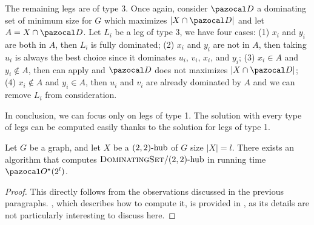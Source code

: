 \medskip

The remaining legs are of type 3. Once again, consider $\D$ a dominating set of minimum size for $G$ which maximizes $|X \cap \D|$ and let $A = X \cap \D$. Let $L_i$ be a leg of type 3, we have four cases: (1) $x_i$ and $y_i$ are both in $A$, then $L_i$ is fully dominated; (2) $x_i$ and $y_i$ are not in $A$, then taking $u_i$ is always the best choice since it dominates $u_i$, $v_i$, $x_i$, and $y_i$; (3) $x_i \in A$ and $y_i \notin A$, then  can apply and $\D$ does not maximizes $|X \cap \D|$; (4) $x_i \notin A$ and $y_i \in A$, then $u_i$ and $v_i$ are already dominated by $A$ and we can remove $L_i$ from consideration.

\medskip

In conclusion, we can focus only on legs of type 1. The solution with every type of legs can be computed easily thanks to the solution for legs of type 1.

\begin{theorem}
    \label{theorem:domset-22-alltypes}
    Let $G$ be a graph, and let $X$ be a $\sdhub[2,2]$ of $G$ size $|X| = l$. There exists an algorithm that computes $\prob{DominatingSet}/\sdhub[2,2]$ in running time $\O^\star(2^l)$.
\end{theorem}

\begin{proof}
    This directly follows from the observations discussed in the previous paragraphs. , which describes how to compute it, is provided in , as its details are not particularly interesting to discuss here.
\end{proof}